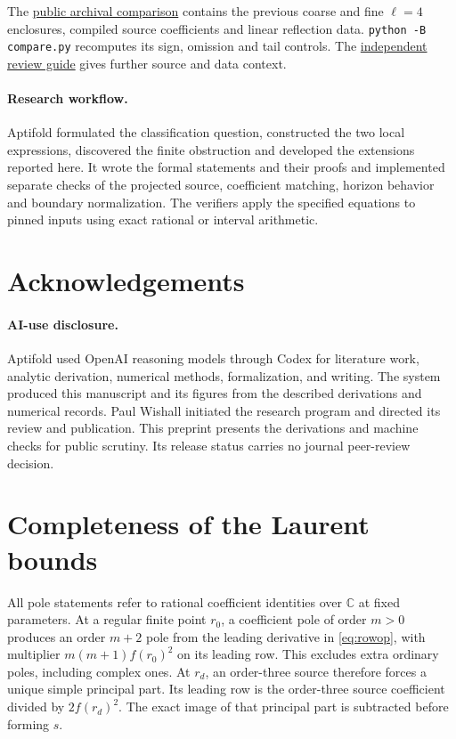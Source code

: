 \documentclass[11pt]{article}
\begin{document}
The \href{https://aptifold.ai/assets/research/2026-11-23/scattering-review-supplement.zip}{public archival comparison}
contains the previous coarse and fine \(\ell=4\) enclosures, compiled source coefficients and linear reflection data.
\texttt{python -B compare.py} recomputes its sign, omission and tail controls.
The \href{https://aptifold.ai/gw-derivation\#independent-review}{independent review guide} gives further source and data context.

\paragraph{Research workflow.}
Aptifold formulated the classification question, constructed the two local expressions, discovered the finite obstruction and developed the extensions reported here. It wrote the formal statements and their proofs and implemented separate checks of the projected source, coefficient matching, horizon behavior and boundary normalization.
The verifiers apply the specified equations to pinned inputs using exact rational or interval arithmetic.

\section*{Acknowledgements}
\paragraph{AI-use disclosure.}

Aptifold used OpenAI reasoning models through Codex for literature work, analytic derivation, numerical methods, formalization, and writing. The system produced this manuscript and its figures from the described derivations and numerical records. Paul Wishall initiated the research program and directed its review and publication. This preprint presents the derivations and machine checks for public scrutiny. Its release status carries no journal peer-review decision.

\appendix
\section{Completeness of the Laurent bounds}
\label{app:poles}

All pole statements refer to rational coefficient identities over \(\mathbb C\) at fixed parameters.
At a regular finite point \(r_0\), a coefficient pole of order \(m>0\) produces an order \(m+2\) pole from the leading derivative in \eqref{eq:rowop}, with multiplier \(m(m+1)f(r_0)^2\) on its leading row.
This excludes extra ordinary poles, including complex ones.
At \(r_d\), an order-three source therefore forces a unique simple principal part.
Its leading row is the order-three source coefficient divided by \(2f(r_d)^2\).
The exact image of that principal part is subtracted before forming \(s\).
\end{document}
